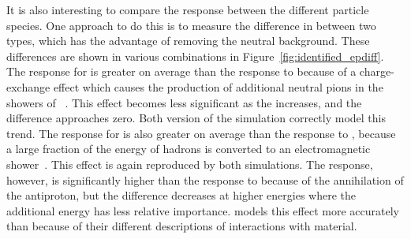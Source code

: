 It is also interesting to compare the response between the different particle species.
One approach to do this is to measure the difference in \epav between two types, which has the advantage of removing the neutral background.
These differences are shown in various combinations in Figure~\ref{fig:identified_epdiff}. 
The response for \pip is greater on average than the response to \pim because of a charge-exchange effect which causes the production of additional neutral pions in the showers of \pip~\cite{particlebeam}. 
This effect becomes less significant as the \epav increases, and the difference approaches zero.
Both version of the simulation correctly model this trend.
The response for \pip is also greater on average than the response to \pP, because a large fraction of the energy of \pip hadrons is converted to an electromagnetic shower~\cite{physicsg,TileTB}. 
This effect is again reproduced by both simulations.
The \pAP response, however, is significantly higher than the response to \pim because of the annihilation of the antiproton, but the difference decreases at higher energies where the additional energy has less relative importance.
\FTFP models this effect more accurately than \QGSP because of their different descriptions of \pAP interactions with material.

